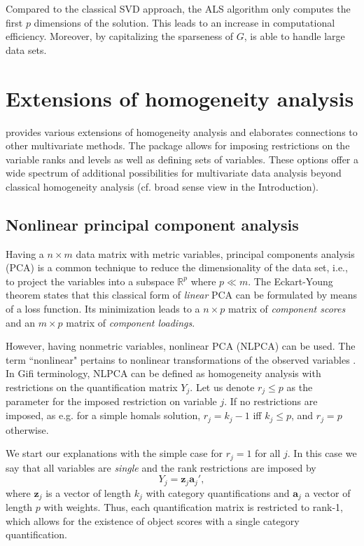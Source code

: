 \documentclass[article]{Z}
\begin{document}
Compared to the classical SVD approach, the ALS algorithm only computes the first $p$ dimensions of the solution. This leads to an increase in computational efficiency. Moreover, by capitalizing the sparseness of $G$,  is able to handle large data sets.

\section{Extensions of homogeneity analysis}
\citet{Gifi:90} provides various extensions of homogeneity analysis and elaborates connections to other multivariate methods. The package  allows for imposing restrictions on the variable ranks and levels as well as defining sets of variables. These options offer a wide spectrum of additional possibilities for multivariate data analysis beyond classical homogeneity analysis (cf. broad sense view in the Introduction).

\subsection{Nonlinear principal component analysis}
Having a $n \times m$ data matrix with metric variables, principal components analysis (PCA) is a common technique to reduce the dimensionality of the data set, i.e., to project the variables into a subspace $\mathbb{R}^p$ where $p \ll m$. The Eckart-Young theorem states that this classical form of \emph{linear} PCA can be formulated by means of a loss function. Its minimization leads to a $n\times p$ matrix of \emph{component scores} and an $m \times p$ matrix of \emph{component loadings}.

However, having nonmetric variables, nonlinear PCA (NLPCA) can be used. The term ``nonlinear" pertains to nonlinear transformations of the observed variables \citep{deLeeuw:06}. In Gifi terminology, NLPCA can be defined as homogeneity analysis with restrictions on the quantification matrix $Y_j$. Let us denote $r_j \leq p$ as the parameter for the imposed restriction on variable $j$. If no restrictions are imposed, as e.g. for a simple homals solution, 
$r_j = k_j -1$ iff $k_j \leq p$, and $r_j = p$ otherwise. 

We start our explanations with the simple case for $r_j = 1$ for all $j$. In this case we say that all variables are \emph{single} and the rank restrictions are imposed by 
\begin{equation}
\label{eq:srank}
Y_j = \mathbf{z}_j\mathbf{a}_j',
\end{equation}
where $\mathbf{z}_j$ is a vector of length $k_j$ with category quantifications and $\boldsymbol{a}_j$ a vector of length $p$ with weights. Thus, each quantification matrix is restricted to rank-1, which allows for the existence of object scores with a single category quantification. 
\end{document}

